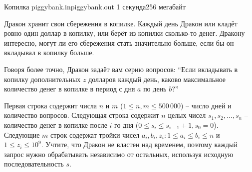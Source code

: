 
\begin{problem}{Копилка}
{piggybank.in}{piggybank.out}
{1 секунда}{256 мегабайт}{}

Дракон хранит свои сбережения в копилке.
Каждый день Дракон или кладёт ровно один доллар в копилку,
или берёт из копилки сколько-то денег.
Дракону интересно, могут ли его сбережения стать значительно больше,
если бы он вкладывал в копилку больше.

Говоря более точно, Дракон задаёт вам серию вопросов: 
``Если вкладывать в копилку дополнительных $z$ долларов каждый день,
каково максимальное количество денег в копилке в период с дня $a$ по день $b$?''



\InputFile

Первая строка содержит числа $n$ и $m$ ($1 \le n, m \le 500\,000$) -- число дней и количество вопросов.
Следующая строка содержит $n$ целых чисел $s_1, s_2, \dots, s_n$ -- количество денег 
в копилке после $i$-го дня ($0 \le s_i \le s_{i-1}+1, s_0 = 0$).
Следующие $m$ строк содержат тройки чисел $a_i, b_i, z_i \colon 1 \le a_i \le b_i \le n$ и $1 \le z_i \le 10^9$.
Учтите, что Дракон не властен над временем, поэтому каждый запрос нужно обрабатывать независимо от остальных,
используя исходную последовательность $s$.



\end{problem}
